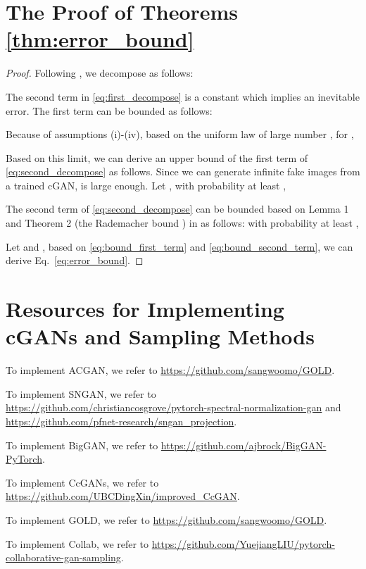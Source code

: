 \documentclass[final,12pt, 3p,times]{elsarticle}
\begin{document}
\section{The Proof of Theorems \ref{thm:error_bound}}\label{supp:proofs}
\begin{proof}
	Following \cite{ding2020subsampling}, we decompose  as follows:
	
	
	The second term in \cref{eq:first_decompose} is a constant which implies an inevitable error. The first term can be bounded as follows:
	
	
	
	Because of assumptions (i)-(iv), based on the uniform law of large number \cite{noteULLN}, for ,
	
	
	
	Based on this limit, we can derive an upper bound of the first term of \cref{eq:second_decompose} as follows. Since we can generate infinite fake images from a trained cGAN,  is large enough. Let ,  with probability at least , 
	
	
	
	The second term of \cref{eq:second_decompose} can be bounded based on Lemma 1 and Theorem 2 (the Rademacher bound \cite{lafferty2010}) in \cite{ding2020subsampling} as follows:  with probability at least ,
	
	
	Let  and , based on \cref{eq:bound_first_term} and \eqref{eq:bound_second_term}, we can derive Eq.\ \eqref{eq:error_bound}.
\end{proof}

\section{Resources for Implementing cGANs and Sampling Methods}\label{supp:resources}

To implement ACGAN, we refer to \url{https://github.com/sangwoomo/GOLD}.

To implement SNGAN, we refer to \url{https://github.com/christiancosgrove/pytorch-spectral-normalization-gan} and \url{https://github.com/pfnet-research/sngan_projection}. 

To implement BigGAN, we refer to \url{https://github.com/ajbrock/BigGAN-PyTorch}. 

To implement CcGANs, we refer to \url{https://github.com/UBCDingXin/improved_CcGAN}.

To implement GOLD, we refer to \url{https://github.com/sangwoomo/GOLD}.

To implement Collab, we refer to \url{https://github.com/YuejiangLIU/pytorch-collaborative-gan-sampling}.
\end{document}
